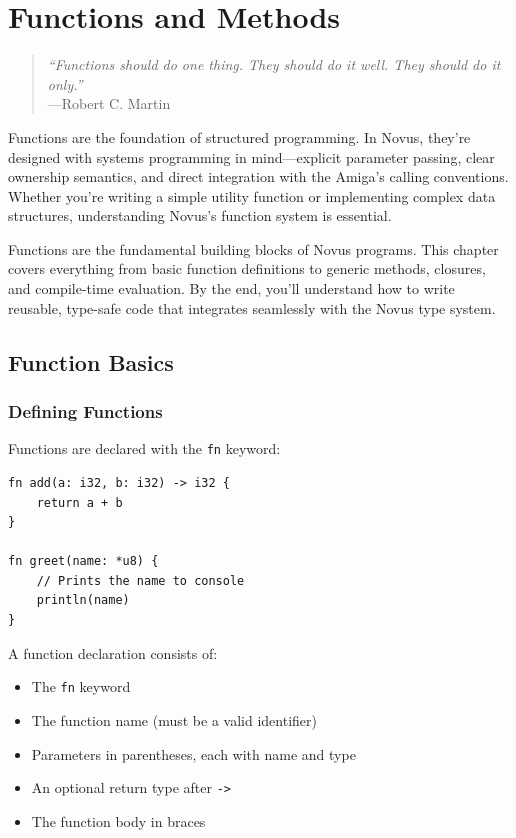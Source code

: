 \chapter{Functions and Methods}
\label{ch:functions}

\begin{quote}
\textit{``Functions should do one thing. They should do it well. They should do it only.''}\\
---Robert C. Martin
\end{quote}

\vspace{1em}

Functions are the foundation of structured programming. In Novus, they're designed with systems programming in mind---explicit parameter passing, clear ownership semantics, and direct integration with the Amiga's calling conventions. Whether you're writing a simple utility function or implementing complex data structures, understanding Novus's function system is essential.

Functions are the fundamental building blocks of Novus programs. This chapter covers everything from basic function definitions to generic methods, closures, and compile-time evaluation. By the end, you'll understand how to write reusable, type-safe code that integrates seamlessly with the Novus type system.

\section{Function Basics}
\label{sec:function-basics}

\subsection{Defining Functions}
\label{subsec:defining-functions}

Functions are declared with the \texttt{fn} keyword:

\begin{lstlisting}
fn add(a: i32, b: i32) -> i32 {
    return a + b
}

fn greet(name: *u8) {
    // Prints the name to console
    println(name)
}
\end{lstlisting}

A function declaration consists of:
\begin{itemize}
    \item The \texttt{fn} keyword
    \item The function name (must be a valid identifier)
    \item Parameters in parentheses, each with name and type
    \item An optional return type after \texttt{->}
    \item The function body in braces
\end{itemize}

